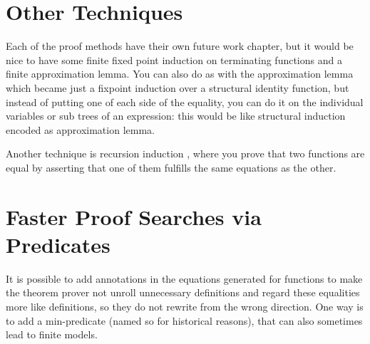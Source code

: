 \section{Other Techniques}

Each of the proof methods have their own future work chapter, but it
would be nice to have some finite fixed point induction on terminating
functions and a finite approximation lemma. You can also do as with
the approximation lemma which became just a fixpoint induction over a
structural identity function, but instead of putting one of each side
of the equality, you can do it on the individual variables or sub
trees of an expression: this would be like structural induction
encoded as approximation lemma.

Another technique is recursion induction \cite{recind}, where you
prove that two functions are equal by asserting that one of them
fulfills the same equations as the other.

\section{Faster Proof Searches via Predicates}

It is possible to add annotations in the equations generated for
functions to make the theorem prover not unroll unnecessary
definitions and regard these equalities more like definitions, so they
do not rewrite from the wrong direction. One way is to add a
min-predicate (named so for historical reasons), that can also
sometimes lead to finite models.

